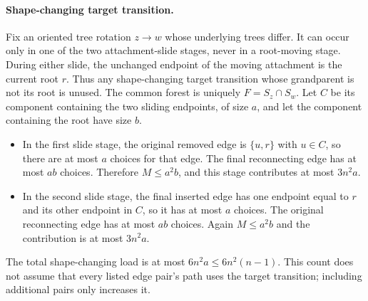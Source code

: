 \documentclass[11pt]{article}
\begin{document}
\paragraph{Shape-changing target transition.}
Fix an oriented tree rotation $z\to w$ whose underlying trees differ.
It can occur only in one of the two attachment-slide stages, never in
a root-moving stage. During either slide, the unchanged endpoint of
the moving attachment is the current root $r$. Thus any shape-changing
target transition whose grandparent is not its root is unused.
The common forest is uniquely $F=S_z\cap S_w$. Let $C$ be its
component containing the two sliding endpoints, of size $a$, and let
the component containing the root have size $b$.
\begin{itemize}
\item In the first slide stage, the original removed edge is $\{u,r\}$
with $u\in C$, so there are at most $a$ choices for that edge.
The final reconnecting edge has at most $ab$ choices. Therefore
$M\le a^2b$, and this stage contributes at most $3n^2a$.
\item In the second slide stage, the final inserted edge has one
endpoint equal to $r$ and its other endpoint in $C$, so it has at
most $a$ choices. The original reconnecting edge has at most $ab$
choices. Again $M\le a^2b$ and the contribution is at most $3n^2a$.
\end{itemize}
The total shape-changing load is at most $6n^2a\le6n^2(n-1)$.
This count does not assume that every listed edge pair's path uses
the target transition; including additional pairs only increases it.
\end{document}
